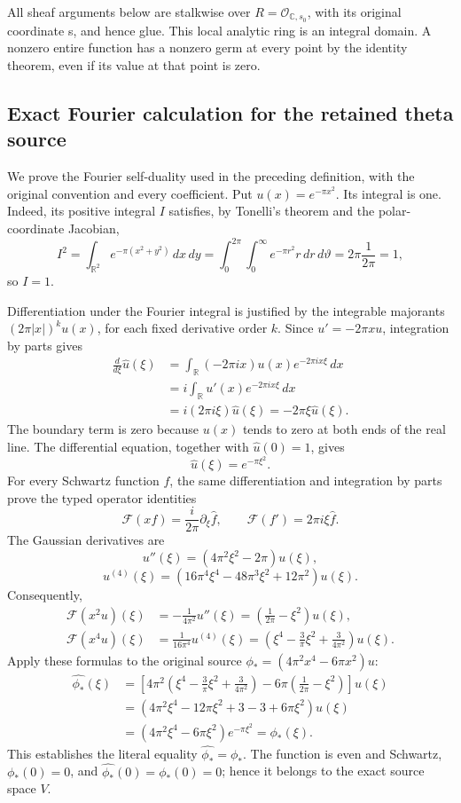 All sheaf arguments below are stalkwise over \(R=\mathcal O_{\mathbb C,s_0}\), with its original coordinate s, and hence glue. This local analytic ring is an integral domain. A nonzero entire function has a nonzero germ at every point by the identity theorem, even if its value at that point is zero.

\subsection{Exact Fourier calculation for the retained theta source}
\label{proof06:lem:typed-route-fourier-phi-star}

We prove the Fourier self-duality used in the preceding definition, with
the original convention and every coefficient. Put
\(u(x)=e^{-\pi x^2}\). Its integral is one. Indeed, its positive integral
\(I\) satisfies, by Tonelli's theorem and the polar-coordinate Jacobian,
\[
I^2=\int_{\mathbb R^2}e^{-\pi(x^2+y^2)}\,dx\,dy
 =\int_0^{2\pi}\int_0^\infty e^{-\pi r^2}r\,dr\,d\vartheta
 =2\pi\frac1{2\pi}=1,
\]
so \(I=1\).

Differentiation under the Fourier integral is justified by the integrable
majorants \((2\pi|x|)^k u(x)\), for each fixed derivative order \(k\).
Since \(u'=-2\pi xu\), integration by parts gives
\[
\begin{aligned}
\frac{d}{d\xi}\widehat u(\xi)
 &=\int_{\mathbb R}(-2\pi ix)u(x)e^{-2\pi ix\xi}\,dx\\
 &=i\int_{\mathbb R}u'(x)e^{-2\pi ix\xi}\,dx\\
 &=i(2\pi i\xi)\widehat u(\xi)
 =-2\pi\xi\widehat u(\xi).
\end{aligned}
\]
The boundary term is zero because \(u(x)\) tends to zero at both
ends of the real line. The differential equation, together with
\(\widehat u(0)=1\), gives
\[
\widehat u(\xi)=e^{-\pi\xi^2}.
\]
For every Schwartz function \(f\), the same differentiation and integration
by parts prove the typed operator identities
\[
\mathcal F(xf)=\frac{i}{2\pi}\partial_\xi\widehat f,\qquad
\mathcal F(f')=2\pi i\xi\widehat f.
\]
The Gaussian derivatives are
\[
u''(\xi)=(4\pi^2\xi^2-2\pi)u(\xi),
\]
\[
u^{(4)}(\xi)=
(16\pi^4\xi^4-48\pi^3\xi^2+12\pi^2)u(\xi).
\]
Consequently,
\[
\begin{aligned}
\mathcal F(x^2u)(\xi)
 &=-\frac1{4\pi^2}u''(\xi)
   =\left(\frac1{2\pi}-\xi^2\right)u(\xi),\\
\mathcal F(x^4u)(\xi)
 &=\frac1{16\pi^4}u^{(4)}(\xi)
   =\left(\xi^4-\frac3\pi\xi^2+\frac3{4\pi^2}\right)u(\xi).
\end{aligned}
\]
Apply these formulas to the original source
\(\phi_*=(4\pi^2x^4-6\pi x^2)u\):
\[
\begin{aligned}
\widehat{\phi_*}(\xi)
 &=\left[
 4\pi^2\left(\xi^4-\frac3\pi\xi^2+\frac3{4\pi^2}\right)
 -6\pi\left(\frac1{2\pi}-\xi^2\right)\right]u(\xi)\\
 &=(4\pi^2\xi^4-12\pi\xi^2+3-3+6\pi\xi^2)u(\xi)\\
 &=(4\pi^2\xi^4-6\pi\xi^2)e^{-\pi\xi^2}
 =\phi_*(\xi).
\end{aligned}
\]
This establishes the literal equality
\(\widehat{\phi_*}=\phi_*\). The function is even and Schwartz,
\(\phi_*(0)=0\), and
\(\widehat{\phi_*}(0)=\phi_*(0)=0\); hence it belongs to the exact source
space \(V\).

